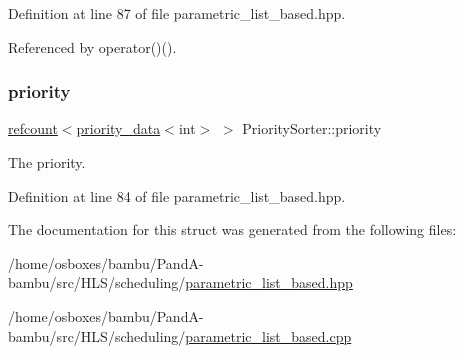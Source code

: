 Definition at line 87 of file parametric\+\_\+list\+\_\+based.\+hpp.



Referenced by operator()().

\mbox{\label{structPrioritySorter_a3e7f7e453d137c12b90d718b3e558d90}} 
\subsubsection{\texorpdfstring{priority}{priority}}
{\footnotesize\ttfamily \hyperlink{structrefcount}{refcount}$<$\hyperlink{structpriority__data}{priority\+\_\+data}$<$int$>$ $>$ Priority\+Sorter\+::priority}



The priority. 



Definition at line 84 of file parametric\+\_\+list\+\_\+based.\+hpp.



The documentation for this struct was generated from the following files\+:\begin{DoxyCompactItemize}
\item 
/home/osboxes/bambu/\+Pand\+A-\/bambu/src/\+H\+L\+S/scheduling/\hyperlink{parametric__list__based_8hpp}{parametric\+\_\+list\+\_\+based.\+hpp}\item 
/home/osboxes/bambu/\+Pand\+A-\/bambu/src/\+H\+L\+S/scheduling/\hyperlink{parametric__list__based_8cpp}{parametric\+\_\+list\+\_\+based.\+cpp}\end{DoxyCompactItemize}

